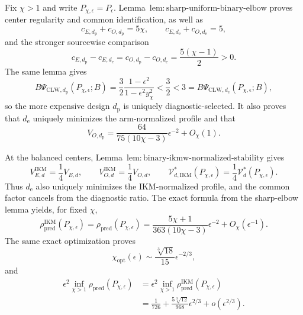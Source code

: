 Fix \(\chi>1\) and write \(P_{\chi,\epsilon}=P_\epsilon\).  Lemma~\(\mathrm{lem{:}sharp\text{-}uniform\text{-}binary\text{-}elbow}\) proves center regularity and common identification, as well as
\[
 c_{E,d_{\mathrm p}}+c_{O,d_{\mathrm p}}=5\chi,
 \qquad
 c_{E,d_{\mathrm e}}+c_{O,d_{\mathrm e}}=5,
\]
and the stronger sourcewise comparison
\[
 c_{E,d_{\mathrm p}}-c_{E,d_{\mathrm e}}
 =c_{O,d_{\mathrm p}}-c_{O,d_{\mathrm e}}
 =\frac{5(\chi-1)}2>0.                                  \tag{1}
\]
The same lemma gives
\[
 B\Psi_{\mathrm{CLW},d_{\mathrm p}}(P_{\chi,\epsilon};B)
 =\frac32\frac{1-\epsilon^2}{1-\epsilon^2y_\chi^2}
 <\frac32<3
 =B\Psi_{\mathrm{CLW},d_{\mathrm e}}(P_{\chi,\epsilon};B), \tag{2}
\]
so the more expensive design \(d_{\mathrm p}\) is uniquely diagnostic-selected.  It also proves that \(d_{\mathrm e}\) uniquely minimizes the arm-normalized profile and that
\[
 V_{O,d_{\mathrm p}}
 =\frac{64}{75(10\chi-3)}\epsilon^{-2}+O_\chi(1).        \tag{3}
\]

At the balanced centers, Lemma~\(\mathrm{lem{:}binary\text{-}ikmw\text{-}normalized\text{-}stability}\) gives
\[
 V_{E,d}^{\mathrm{IKM}}=\frac14V_{E,d},
 \qquad
 V_{O,d}^{\mathrm{IKM}}=\frac14V_{O,d},
 \qquad
 \mathcal V_{d,\mathrm{IKM}}^*(P_{\chi,\epsilon})
 =\frac14\mathcal V_d^*(P_{\chi,\epsilon}).             \tag{4}
\]
Thus \(d_{\mathrm e}\) also uniquely minimizes the IKM-normalized profile, and the common factor cancels from the diagnostic ratio.  The exact formula from the sharp-elbow lemma yields, for fixed \(\chi\),
\[
 \rho_{\mathrm{pred}}^{\mathrm{IKM}}(P_{\chi,\epsilon})
 =\rho_{\mathrm{pred}}(P_{\chi,\epsilon})
 =\frac{5\chi+1}{363(10\chi-3)}\epsilon^{-2}
 +O_\chi(\epsilon^{-1}).                                \tag{5}
\]
The same exact optimization proves
\[
 \chi_{\mathrm{opt}}(\epsilon)
 \sim\frac{\sqrt[3]{18}}{15}\epsilon^{-2/3},            \tag{6}
\]
and
\[
\begin{aligned}
 \epsilon^2\inf_{\chi>1}\rho_{\mathrm{pred}}(P_{\chi,\epsilon})
 &=\epsilon^2\inf_{\chi>1}\rho_{\mathrm{pred}}^{\mathrm{IKM}}(P_{\chi,\epsilon})\\
 &=\frac1{726}+\frac{5\sqrt[3]{12}}{968}\epsilon^{2/3}
 +o(\epsilon^{2/3}).                                    \tag{7}
\end{aligned}
\]

